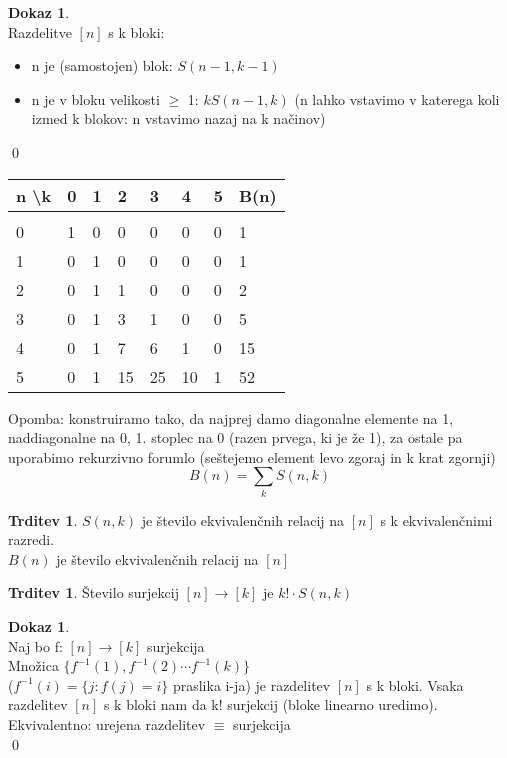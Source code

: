 \documentclass[a4paper,12pt]{article}
\theoremstyle{definition}
\newtheorem{claim}[counter]{Trditev}
\newtheorem{pro}[counter]{Dokaz}
\theoremstyle{remark}
\begin{document}
\begin{pro}\mbox{}\\
    Razdelitve $[n]$ s k bloki:
    \begin{itemize}
        \item n je (samostojen) blok: $S(n-1, k-1)$
        \item n je v bloku velikosti $\geq$ 1: $k S(n-1, k)$ (n lahko vstavimo v katerega koli izmed k blokov:
            n vstavimo nazaj na k načinov)
    \end{itemize}
    \qed
\end{pro}

\begin{tabular}{l|llllll|l}
    n \textbackslash k & 0 & 1  & 2  & 3  & 4  & 5 & B(n) \\
    \hline \\
    0 & 1 & 0  & 0  & 0  & 0  & 0 & 1 \\
    1 & 0 & 1  & 0  & 0  & 0  & 0 & 1 \\
    2 & 0 & 1  & 1  & 0  & 0  & 0 & 2 \\
    3 & 0 & 1  & 3  & 1  & 0  & 0 & 5 \\
    4 & 0 & 1  & 7  & 6  & 1  & 0 & 15 \\
    5 & 0 & 1  & 15 & 25 & 10 & 1 & 52
\end{tabular}

Opomba: konstruiramo tako, da najprej damo diagonalne elemente na 1, naddiagonalne na 0, 1. stoplec
na 0 (razen prvega, ki je že 1), za ostale pa uporabimo rekurzivno forumlo (seštejemo element levo
zgoraj in k krat zgornji) \\
\[B(n) = \sum_k S(n,k)\]

\begin{claim}
    $S(n,k)$ je število ekvivalenčnih relacij na $[n]$ s k ekvivalenčnimi razredi. \\
    $B(n)$ je število ekvivalenčnih relacij na $[n]$
\end{claim}

\begin{claim}
    Število surjekcij $[n] \rightarrow [k]$ je $k! \cdot S(n,k)$
\end{claim}

\begin{pro}\mbox{}\\
    Naj bo f: $[n] \rightarrow [k]$ surjekcija \\
    Množica $\{f^{-1}(1), f^{-1}(2) \cdots f^{-1}(k)\}$ \\
    ($f^{-1}(i) = \{j: f(j) = i\}$ praslika i-ja) je razdelitev $[n]$ s k bloki.
    Vsaka razdelitev $[n]$ s k bloki nam da k! surjekcij
    (bloke linearno uredimo). \\
    Ekvivalentno: urejena razdelitev $\equiv$ surjekcija \\
    \qed
\end{pro}
\end{document}
